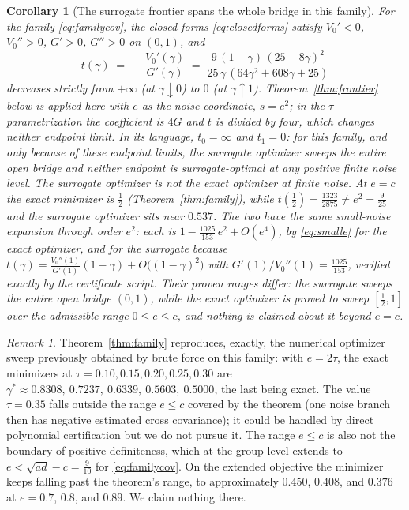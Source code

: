 \documentclass[11pt]{article}
\newtheorem{corollary}{Corollary}
\theoremstyle{remark}
\newtheorem{remark}{Remark}
\begin{document}
\begin{corollary}[The surrogate frontier spans the whole bridge in this
family]
\label{cor:famsurr}
For the family \eqref{eq:familycov}, the closed forms
\eqref{eq:closedforms} satisfy $V_0' < 0$, $V_0'' > 0$, $G' > 0$, $G'' > 0$
on $(0,1)$, and
\[
  t(\gamma) \;=\; -\frac{V_0'(\gamma)}{G'(\gamma)}
  \;=\; \frac{9\,(1 - \gamma)\,(25 - 8\gamma)^2}
        {25\,\gamma\,(64\gamma^2 + 608\gamma + 25)}
\]
decreases strictly from $+\infty$ (at $\gamma \downarrow 0$) to $0$ (at
$\gamma \uparrow 1$). Theorem~\ref{thm:frontier} below is applied here with
$e$ as the noise coordinate, $s = e^2$; in the $\tau$ parametrization the
coefficient is $4G$ and $t$ is divided by four, which changes neither
endpoint limit. In its language, $t_0 = \infty$ and $t_1 = 0$: for this
family, and only because of these endpoint limits, the surrogate optimizer
sweeps the entire open bridge and neither endpoint is surrogate-optimal at
any positive finite noise level.
The surrogate optimizer is not the exact optimizer at finite noise. At
$e = c$ the exact minimizer is $\tfrac12$ (Theorem~\ref{thm:family}), while
$t(\tfrac12) = \tfrac{1323}{2875} \ne e^2 = \tfrac{9}{25}$ and the
surrogate optimizer sits near $0.537$. The two have the same small-noise
expansion through order $e^2$: each is $1 - \tfrac{1025}{153}\,e^2 +
O(e^4)$, by \eqref{eq:smalle} for the exact optimizer, and for the
surrogate because $t(\gamma) = \tfrac{V_0''(1)}{G'(1)}(1 - \gamma) +
O\big((1-\gamma)^2\big)$ with $G'(1)/V_0''(1) = \tfrac{1025}{153}$,
verified exactly by the certificate script. Their proven ranges differ:
the surrogate sweeps the entire open bridge $(0,1)$, while the exact
optimizer is proved to sweep $[\tfrac12, 1]$ over the admissible range
$0 \le e \le c$, and nothing is claimed about it beyond $e = c$.
\end{corollary}

\begin{remark}
Theorem~\ref{thm:family} reproduces, exactly, the numerical optimizer sweep
previously obtained by brute force on this family: with $e = 2\tau$, the
exact minimizers at $\tau = 0.10, 0.15, 0.20, 0.25, 0.30$ are
$\gamma^* \approx 0.8308,\ 0.7237,\ 0.6339,\ 0.5603,\ 0.5000$, the last
being exact. The value $\tau = 0.35$ falls outside the range $e \le c$
covered by the theorem (one noise branch then has negative estimated
cross covariance); it could be handled by direct polynomial certification
but we do not pursue it. The range $e \le c$ is also not the boundary of
positive definiteness, which at the group level extends to
$e < \sqrt{ad} - c = \tfrac{9}{10}$ for \eqref{eq:familycov}. On the
extended objective the minimizer keeps falling past the theorem's range,
to approximately $0.450$, $0.408$, and $0.376$ at $e = 0.7$, $0.8$, and
$0.89$. We claim nothing there.
\end{remark}
\end{document}
